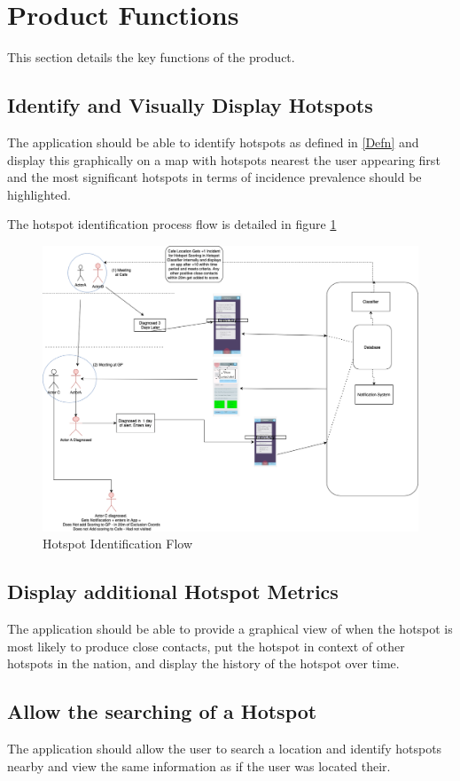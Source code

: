 \documentclass{scrreprt}
\begin{document}
\section{Product Functions}\label{ProductFunction}
This section details the key functions of the product.

\subsection{Identify and Visually Display Hotspots}
The application should be able to identify hotspots as defined in \ref{Defn} and display this graphically on a map with hotspots nearest the user appearing first and the most significant hotspots in terms of incidence prevalence should be highlighted.

The hotspot identification process flow is detailed in figure \ref{hotflow}
\begin{figure}[H]
	\centering
	\includegraphics[page=1, width=0.95\linewidth]{COMP30830-HotSpotClassifierFlow}
	\caption{Hotspot Identification Flow}
	\label{hotflow}
\end{figure}

\subsection{Display additional Hotspot Metrics}
The application should be able to provide a graphical view of when the hotspot is most likely to produce close contacts, put the hotspot in context of other hotspots in the nation, and display the history of the hotspot over time.

\subsection{Allow the searching of a Hotspot}
The application should allow the user to search a location and identify hotspots nearby and view the same information as if the user was located their.
\end{document}
